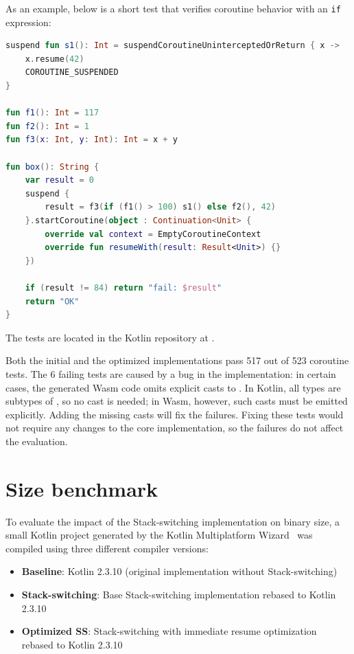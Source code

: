 As an example, below is a short test that verifies coroutine behavior with an \texttt{if} expression:

\begin{lstlisting}[language=Kotlin, caption={Example from controlFlow\_if1.kt}]
suspend fun s1(): Int = suspendCoroutineUninterceptedOrReturn { x ->
    x.resume(42)
    COROUTINE_SUSPENDED
}

fun f1(): Int = 117
fun f2(): Int = 1
fun f3(x: Int, y: Int): Int = x + y

fun box(): String {
    var result = 0
    suspend {
        result = f3(if (f1() > 100) s1() else f2(), 42)
    }.startCoroutine(object : Continuation<Unit> {
        override val context = EmptyCoroutineContext
        override fun resumeWith(result: Result<Unit>) {}
    })

    if (result != 84) return "fail: $result"
    return "OK"
}
\end{lstlisting}

The tests are located in the Kotlin repository at .

Both the initial and the optimized implementations pass 517 out of 523 coroutine tests. The 6 failing tests are
caused by a bug in the implementation: in certain cases, the generated Wasm code omits explicit casts to
. In Kotlin, all types are subtypes of , so no cast is needed; in Wasm, however,
such casts must be emitted explicitly. Adding the missing casts will fix the failures. Fixing these tests would not
require any changes to the core implementation, so the failures do not affect the evaluation.

\section{Size benchmark}
\label{sec:size-bench}

To evaluate the impact of the Stack-switching implementation on binary size, a small Kotlin project generated by
the Kotlin Multiplatform Wizard~\cite{kotlin-multiplatform-wizard}
was compiled using three different compiler versions:

\begin{itemize}
    \item \textbf{Baseline}: Kotlin 2.3.10 (original implementation without Stack-switching)
    \item \textbf{Stack-switching}: Base Stack-switching implementation rebased to Kotlin 2.3.10
    \item \textbf{Optimized SS}: Stack-switching with immediate resume optimization rebased to Kotlin 2.3.10
\end{itemize}

